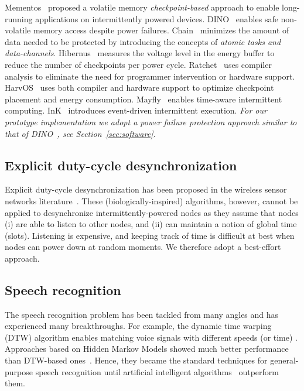 Mementos~\cite{ransford2011mementos} proposed a volatile memory \emph{checkpoint-based} approach to enable long-running applications on intermittently powered devices. DINO~\cite{dino} enables safe non-volatile memory access despite power failures. Chain~\cite{colin2016chain} minimizes the amount of data needed to be protected by introducing the concepts of \emph{atomic tasks and data-channels}. Hibernus~\cite{balsamo2014hibernus,balsamo2016hibernus++} measures the voltage level in the energy buffer to reduce the number of checkpoints per power cycle. Ratchet~\cite{van2016intermittent} uses compiler analysis to eliminate the need for programmer intervention or hardware support. HarvOS~\cite{bhatti2017harvos} uses both compiler and hardware support to optimize checkpoint placement and energy consumption. Mayfly~\cite{hester2017timely} enables time-aware intermittent computing. InK~\cite{yildirim2018ink} introduces event-driven intermittent execution.  
\emph{For our prototype implementation we adopt a power failure protection approach similar to that of DINO~\cite{dino}, see Section~\ref{sec:software}.}

\subsection{Explicit duty-cycle desynchronization}%
Explicit duty-cycle desynchronization has been proposed in the wireless sensor networks literature~\cite{degesys2007desync,giusti2007decentralized,zheng2013survey}. 
These (biologically-inspired) algorithms, however, cannot be applied to desynchronize intermittently-powered nodes as they assume that nodes (i) are able to listen to other nodes, and (ii) can maintain a notion of global time (slots). Listening is expensive, and keeping track of time is difficult at best when nodes can power down at random moments. We therefore adopt a best-effort approach.

\subsection{Speech recognition}

The speech recognition problem has been tackled from many angles and has experienced many breakthroughs. For example, the dynamic time warping (DTW) algorithm enables matching voice signals with different speeds (or time) \cite{vintsyuk1968speech}. 
Approaches based on Hidden Markov Models showed much better performance than DTW-based ones~\cite{jelinek1997statistical}. Hence, they became the standard techniques for general-purpose speech recognition until artificial intelligent algorithms~\cite{hinton2012deep} outperform them. 

